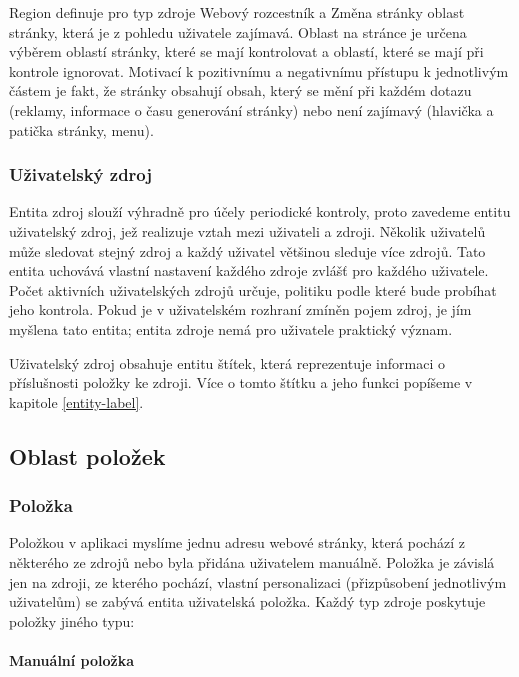 Region definuje pro typ zdroje Webový rozcestník a Změna stránky oblast stránky, která je z pohledu uživatele zajímavá.
Oblast na stránce je určena výběrem oblastí stránky, které se mají kontrolovat a oblastí, které se mají při kontrole ignorovat.
Motivací k pozitivnímu a negativnímu přístupu k jednotlivým částem je fakt, že stránky obsahují obsah, který se mění při každém dotazu (reklamy, informace o času generování stránky) nebo není zajímavý (hlavička a patička stránky, menu).

\subsubsection{Uživatelský zdroj}

Entita zdroj slouží výhradně pro účely periodické kontroly, proto zavedeme entitu uživatelský zdroj, jež realizuje vztah mezi uživateli a zdroji.
Několik uživatelů může sledovat stejný zdroj a každý uživatel většinou sleduje více zdrojů.
Tato entita uchovává vlastní nastavení každého zdroje zvlášť pro každého uživatele.
Počet aktivních uživatelských zdrojů určuje, politiku podle které bude probíhat jeho kontrola.
Pokud je v uživatelském rozhraní zmíněn pojem zdroj, je jím myšlena tato entita; entita zdroje nemá pro uživatele praktický význam.

Uživatelský zdroj obsahuje entitu štítek, která reprezentuje informaci o příslušnosti položky ke zdroji.
Více o tomto štítku a jeho funkci popíšeme v kapitole \ref{entity-label}.

\subsection{Oblast položek}

\subsubsection{Položka}

Položkou v aplikaci myslíme jednu adresu webové stránky, která pochází z některého ze zdrojů nebo byla přidána uživatelem manuálně.
Položka je závislá jen na zdroji, ze kterého pochází, vlastní personalizaci (přizpůsobení jednotlivým uživatelům) se zabývá entita uživatelská položka.
Každý typ zdroje poskytuje položky jiného typu:

\paragraph{Manuální položka}

